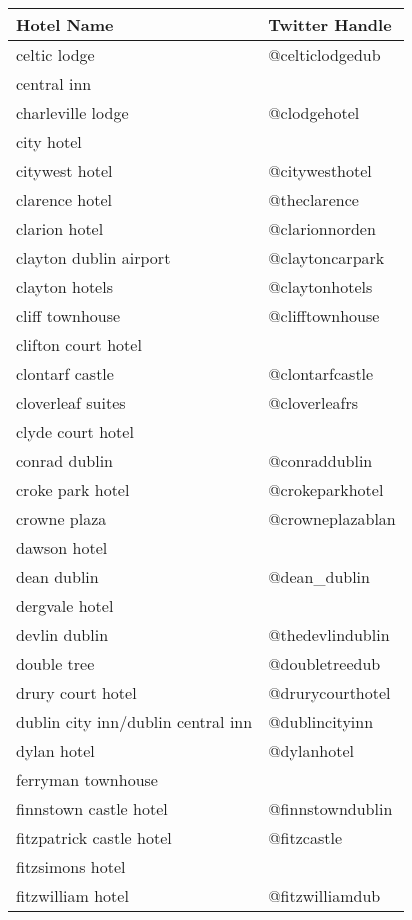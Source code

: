\begin{table}[h!]
\begin{tabular}{|p{7cm}|p{5cm}|}
\hline
\rowcolor[HTML]{EFEFEF}
\textbf{Hotel Name} & \textbf{Twitter Handle} \\ \hline
celtic lodge & @celticlodgedub \\ \hline
central inn &  \\ \hline
charleville lodge & @clodgehotel \\ \hline
city hotel &  \\ \hline
citywest hotel & @citywesthotel \\ \hline
clarence hotel & @theclarence \\ \hline
clarion hotel & @clarionnorden \\ \hline
clayton dublin airport & @claytoncarpark \\ \hline
clayton hotels & @claytonhotels \\ \hline
cliff townhouse & @clifftownhouse \\ \hline
clifton court hotel &  \\ \hline
clontarf castle & @clontarfcastle \\ \hline
cloverleaf suites & @cloverleafrs \\ \hline
clyde court hotel &  \\ \hline
conrad dublin & @conraddublin \\ \hline
croke park hotel & @crokeparkhotel \\ \hline
crowne plaza & @crowneplazablan \\ \hline
dawson hotel &  \\ \hline
dean dublin & @dean\_dublin \\ \hline
dergvale hotel &  \\ \hline
devlin dublin & @thedevlindublin \\ \hline
double tree & @doubletreedub \\ \hline
drury court hotel & @drurycourthotel \\ \hline
dublin city inn/dublin central inn & @dublincityinn \\ \hline
dylan hotel & @dylanhotel \\ \hline
ferryman townhouse &  \\ \hline
finnstown castle hotel & @finnstowndublin \\ \hline
fitzpatrick castle hotel & @fitzcastle \\ \hline
fitzsimons hotel &  \\ \hline
fitzwilliam hotel & @fitzwilliamdub \\ \hline

\end{tabular}
\end{table}
